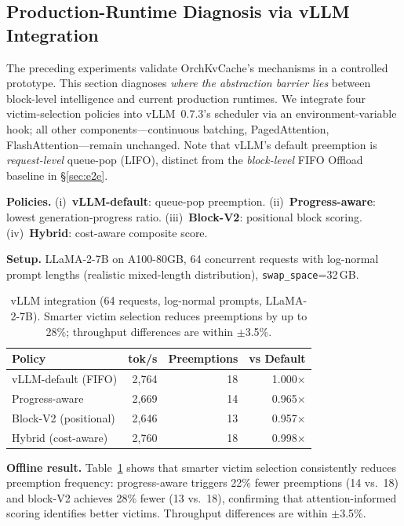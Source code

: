 \documentclass[conference]{IEEEtran}
\begin{document}
\subsection{Production-Runtime Diagnosis via vLLM Integration}
\label{sec:vllm-integration}

The preceding experiments validate OrchKvCache's mechanisms in a controlled prototype. This section diagnoses \emph{where the abstraction barrier lies} between block-level intelligence and current production runtimes. We integrate four victim-selection policies into vLLM~0.7.3's scheduler via an environment-variable hook; all other components---continuous batching, PagedAttention, FlashAttention---remain unchanged. Note that vLLM's default preemption is \emph{request-level} queue-pop (LIFO), distinct from the \emph{block-level} FIFO Offload baseline in \S\ref{sec:e2e}.

\textbf{Policies.} (i)~\textbf{vLLM-default}: queue-pop preemption. (ii)~\textbf{Progress-aware}: lowest generation-progress ratio. (iii)~\textbf{Block-V2}: positional block scoring. (iv)~\textbf{Hybrid}: cost-aware composite score.

\textbf{Setup.} LLaMA-2-7B on A100-80GB, 64 concurrent requests with log-normal prompt lengths (realistic mixed-length distribution), \texttt{swap\_space}=32\,GB.

\begin{table}[t]
\centering
\caption{vLLM integration (64 requests, log-normal prompts, LLaMA-2-7B). Smarter victim selection reduces preemptions by up to 28\%; throughput differences are within $\pm$3.5\%.}
\label{tab:vllm-realistic}
\small
\setlength{\tabcolsep}{8pt}
\begin{tabular}{@{}lrrr@{}}
\toprule
Policy & tok/s & Preemptions & vs Default \\
\midrule
vLLM-default (FIFO)    & 2{,}764 & 18 & 1.000$\times$ \\
Progress-aware          & 2{,}669 & 14 & 0.965$\times$ \\
Block-V2 (positional)   & 2{,}646 & 13 & 0.957$\times$ \\
Hybrid (cost-aware)     & 2{,}760 & 18 & 0.998$\times$ \\
\bottomrule
\end{tabular}
\end{table}

\textbf{Offline result.} Table~\ref{tab:vllm-realistic} shows that smarter victim selection consistently reduces preemption frequency: progress-aware triggers 22\% fewer preemptions (14 vs.\ 18) and block-V2 achieves 28\% fewer (13 vs.\ 18), confirming that attention-informed scoring identifies better victims. Throughput differences are within $\pm$3.5\%.
\end{document}
